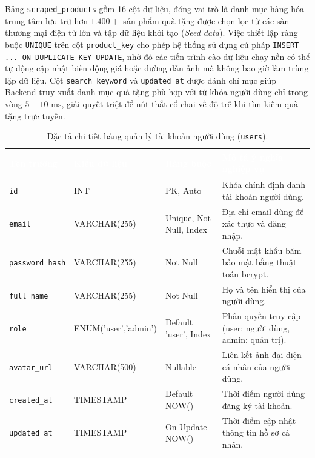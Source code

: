 Bảng \texttt{scraped\_products} gồm 16 cột dữ liệu, đóng vai trò là danh mục hàng hóa trung tâm lưu trữ hơn $1.400+$ sản phẩm quà tặng được chọn lọc từ các sàn thương mại điện tử lớn và tập dữ liệu khởi tạo (\textit{Seed data}). Việc thiết lập ràng buộc \texttt{UNIQUE} trên cột \texttt{product\_key} cho phép hệ thống sử dụng cú pháp \texttt{INSERT ... ON DUPLICATE KEY UPDATE}, nhờ đó các tiến trình cào dữ liệu chạy nền có thể tự động cập nhật biến động giá hoặc đường dẫn ảnh mà không bao giờ làm trùng lặp dữ liệu. Cột \texttt{search\_keyword} và \texttt{updated\_at} được đánh chỉ mục giúp Backend truy xuất danh mục quà tặng phù hợp với từ khóa người dùng chỉ trong vòng $5 - 10\text{ ms}$, giải quyết triệt để nút thắt cổ chai về độ trễ khi tìm kiếm quà tặng trực tuyến.

\begin{table}[htbp]
\centering
\caption{Đặc tả chi tiết bảng quản lý tài khoản người dùng (\texttt{users}).}
\label{tab:db_users}
\small
\renewcommand{\arraystretch}{1.25}
\begin{tabularx}{\textwidth}{|p{3.0cm}|p{2.6cm}|p{2.8cm}|X|}
\hline
\rowcolor{PrimaryBlue}
\textcolor{white}{\textbf{Tên trường}} &
\textcolor{white}{\textbf{Kiểu dữ liệu}} &
\textcolor{white}{\textbf{Ràng buộc}} &
\textcolor{white}{\textbf{Mô tả ý nghĩa nghiệp vụ}} \\
\hline
\texttt{id} & INT & PK, Auto & Khóa chính định danh tài khoản người dùng. \\
\hline
\texttt{email} & VARCHAR(255) & Unique, Not Null, Index & Địa chỉ email dùng để xác thực và đăng nhập. \\
\hline
\texttt{password\_hash} & VARCHAR(255) & Not Null & Chuỗi mật khẩu băm bảo mật bằng thuật toán bcrypt. \\
\hline
\texttt{full\_name} & VARCHAR(255) & Not Null & Họ và tên hiển thị của người dùng. \\
\hline
\texttt{role} & ENUM('user','admin') & Default 'user', Index & Phân quyền truy cập (user: người dùng, admin: quản trị). \\
\hline
\texttt{avatar\_url} & VARCHAR(500) & Nullable & Liên kết ảnh đại diện cá nhân của người dùng. \\
\hline
\texttt{created\_at} & TIMESTAMP & Default NOW() & Thời điểm người dùng đăng ký tài khoản. \\
\hline
\texttt{updated\_at} & TIMESTAMP & On Update NOW() & Thời điểm cập nhật thông tin hồ sơ cá nhân. \\
\hline
\end{tabularx}
\end{table}

